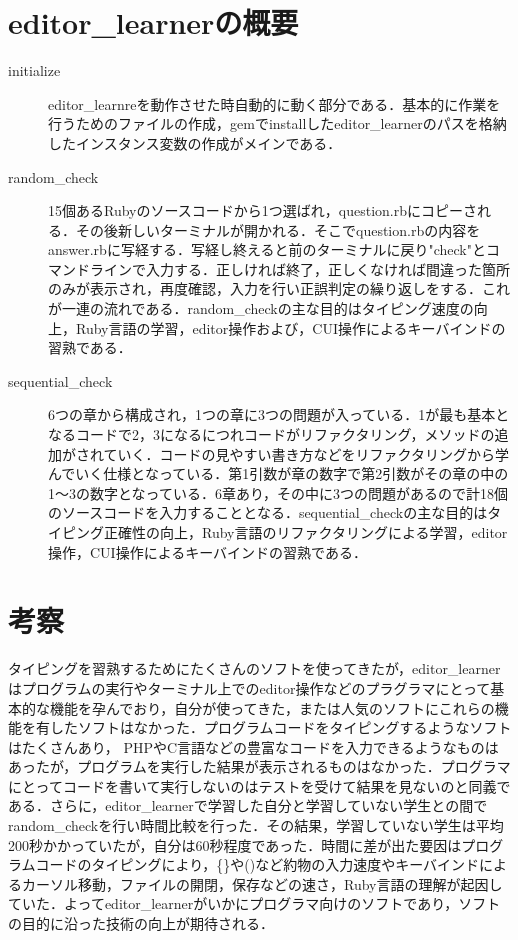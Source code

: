 \documentclass[a4j,twocolumn]{jsarticle}
\begin{document}
\section{editor\_learnerの概要}
\begin{description}
\item[initialize]
editor\_learnreを動作させた時自動的に動く部分である．基本的に作業を行うためのファイルの作成，gemでinstallしたeditor\_learnerのパスを格納したインスタンス変数の作成がメインである．
\item[random\_check] 
15個あるRubyのソースコードから1つ選ばれ，question.rbにコピーされる．その後新しいターミナルが開かれる．そこでquestion.rbの内容をanswer.rbに写経する．写経し終えると前のターミナルに戻り"check"とコマンドラインで入力する．正しければ終了，正しくなければ間違った箇所のみが表示され，再度確認，入力を行い正誤判定の繰り返しをする．これが一連の流れである．random\_checkの主な目的はタイピング速度の向上，Ruby言語の学習，editor操作および，CUI操作によるキーバインドの習熟である．
\item[sequential\_check]
6つの章から構成され，1つの章に3つの問題が入っている．1が最も基本となるコードで2，3になるにつれコードがリファクタリング，メソッドの追加がされていく．コードの見やすい書き方などをリファクタリングから学んでいく仕様となっている．第1引数が章の数字で第2引数がその章の中の1〜3の数字となっている．6章あり，その中に3つの問題があるので計18個のソースコードを入力することとなる．sequential\_checkの主な目的はタイピング正確性の向上，Ruby言語のリファクタリングによる学習，editor操作，CUI操作によるキーバインドの習熟である．
\end{description}

\section{考察}
タイピングを習熟するためにたくさんのソフトを使ってきたが，editor\_learnerはプログラムの実行やターミナル上でのeditor操作などのプラグラマにとって基本的な機能を孕んでおり，自分が使ってきた，または人気のソフトにこれらの機能を有したソフトはなかった．プログラムコードをタイピングするようなソフトはたくさんあり， PHPやC言語などの豊富なコードを入力できるようなものはあったが，プログラムを実行した結果が表示されるものはなかった．プログラマにとってコードを書いて実行しないのはテストを受けて結果を見ないのと同義である．さらに，editor\_learnerで学習した自分と学習していない学生との間でrandom\_checkを行い時間比較を行った．その結果，学習していない学生は平均200秒かかっていたが，自分は60秒程度であった．時間に差が出た要因はプログラムコードのタイピングにより，\{\}や()など約物の入力速度やキーバインドによるカーソル移動，ファイルの開閉，保存などの速さ，Ruby言語の理解が起因していた．よってeditor\_learnerがいかにプログラマ向けのソフトであり，ソフトの目的に沿った技術の向上が期待される．
\end{document}
